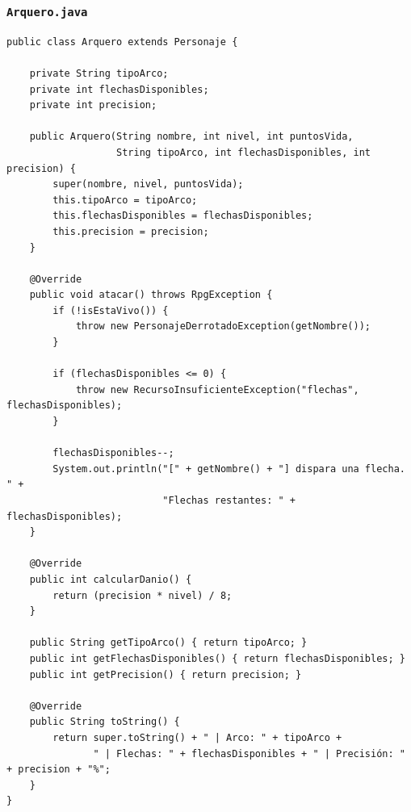 \documentclass[11pt,letterpaper]{article}
\begin{document}
\subsubsection{\texttt{Arquero.java}}
\begin{lstlisting}[style=JavaStyle]
public class Arquero extends Personaje {

    private String tipoArco;
    private int flechasDisponibles;
    private int precision;

    public Arquero(String nombre, int nivel, int puntosVida,
                   String tipoArco, int flechasDisponibles, int precision) {
        super(nombre, nivel, puntosVida);
        this.tipoArco = tipoArco;
        this.flechasDisponibles = flechasDisponibles;
        this.precision = precision;
    }

    @Override
    public void atacar() throws RpgException {
        if (!isEstaVivo()) {
            throw new PersonajeDerrotadoException(getNombre());
        }

        if (flechasDisponibles <= 0) {
            throw new RecursoInsuficienteException("flechas", flechasDisponibles);
        }

        flechasDisponibles--;
        System.out.println("[" + getNombre() + "] dispara una flecha. " +
                           "Flechas restantes: " + flechasDisponibles);
    }

    @Override
    public int calcularDanio() {
        return (precision * nivel) / 8;
    }

    public String getTipoArco() { return tipoArco; }
    public int getFlechasDisponibles() { return flechasDisponibles; }
    public int getPrecision() { return precision; }

    @Override
    public String toString() {
        return super.toString() + " | Arco: " + tipoArco +
               " | Flechas: " + flechasDisponibles + " | Precisión: " + precision + "%";
    }
}
\end{lstlisting}
\end{document}
